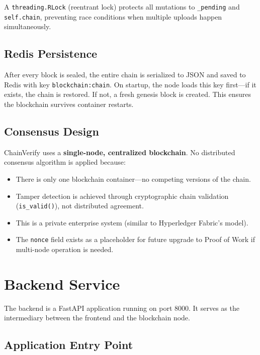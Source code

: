 \documentclass[12pt, a4paper]{report}
\begin{document}
A \texttt{threading.RLock} (reentrant lock) protects all mutations to
\texttt{\_pending} and \texttt{self.chain}, preventing race conditions when
multiple uploads happen simultaneously.

\section{Redis Persistence}

After every block is sealed, the entire chain is serialized to JSON and saved
to Redis with key \texttt{blockchain:chain}. On startup, the node loads this
key first—if it exists, the chain is restored. If not, a fresh genesis block is
created. This ensures the blockchain survives container restarts.

\section{Consensus Design}

ChainVerify uses a \textbf{single-node, centralized blockchain}. No distributed
consensus algorithm is applied because:

\begin{itemize}
    \item There is only one blockchain container—no competing versions of the chain.
    \item Tamper detection is achieved through cryptographic chain validation
          (\texttt{is\_valid()}), not distributed agreement.
    \item This is a private enterprise system (similar to Hyperledger Fabric's model).
    \item The \texttt{nonce} field exists as a placeholder for future upgrade to
          Proof of Work if multi-node operation is needed.
\end{itemize}


\chapter{Backend Service}

The backend is a FastAPI application running on port 8000. It serves as the
intermediary between the frontend and the blockchain node.

\section{Application Entry Point}
\end{document}
